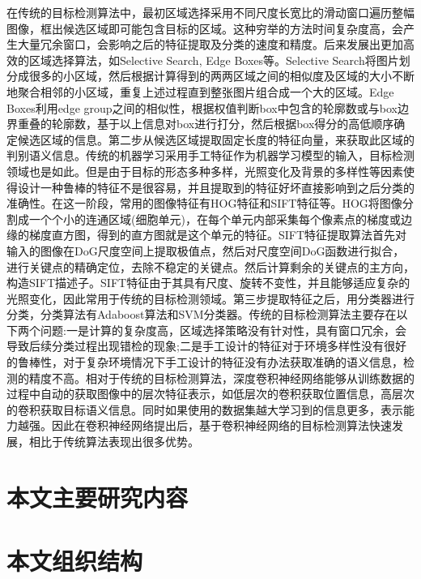 在传统的目标检测算法中，最初区域选择采用不同尺度长宽比的滑动窗口遍历整幅图像，框出候选区域即可能包含目标的区域\cite{胡伏原2020基于卷积神经网络的目标检测算法综述,kira1992feature}。这种穷举的方法时间复杂度高，会产生大量冗余窗口，会影响之后的特征提取及分类的速度和精度。后来发展出更加高效的区域选择算法，如Selective Search\cite{uijlings2013selective},  Edge Boxes\cite{zitnick2014edge}等。Selective Search将图片划分成很多的小区域，然后根据计算得到的两两区域之间的相似度及区域的大小不断地聚合相邻的小区域，重复上述过程直到整张图片组合成一个大的区域。Edge Boxes利用edge group之间的相似性，根据权值判断box中包含的轮廓数或与box边界重叠的轮廓数，基于以上信息对box进行打分，然后根据box得分的高低顺序确定候选区域的信息。第二步从候选区域提取固定长度的特征向量，来获取此区域的判别语义信息。传统的机器学习采用手工特征作为机器学习模型的输入，目标检测领域也是如此。但是由于目标的形态多种多样，光照变化及背景的多样性等因素使得设计一种鲁棒的特征不是很容易，并且提取到的特征好坏直接影响到之后分类的准确性。在这一阶段，常用的图像特征有HOG特征和SIFT特征等。HOG将图像分割成一个个小的连通区域(细胞单元)，在每个单元内部采集每个像素点的梯度或边缘的梯度直方图，得到的直方图就是这个单元的特征。SIFT特征提取算法首先对输入的图像在DoG尺度空间上提取极值点，然后对尺度空间DoG函数进行拟合，进行关键点的精确定位，去除不稳定的关键点。然后计算剩余的关键点的主方向，构造SIFT描述子。SIFT特征由于其具有尺度、旋转不变性，并且能够适应复杂的光照变化，因此常用于传统的目标检测领域。第三步提取特征之后，用分类器进行分类，分类算法有Adaboost算法和SVM分类器。传统的目标检测算法主要存在以下两个问题:一是计算的复杂度高，区域选择策略没有针对性，具有窗口冗余，会导致后续分类过程出现错检的现象;二是手工设计的特征对于环境多样性没有很好的鲁棒性，对于复杂环境情况下手工设计的特征没有办法获取准确的语义信息，检测的精度不高。相对于传统的目标检测算法，深度卷积神经网络能够从训练数据的过程中自动的获取图像中的层次特征表示，如低层次的卷积获取位置信息，高层次的卷积获取目标语义信息。同时如果使用的数据集越大学习到的信息更多，表示能力越强。因此在卷积神经网络提出后，基于卷积神经网络的目标检测算法快速发展，相比于传统算法表现出很多优势。
\section{本文主要研究内容}

\section{本文组织结构}